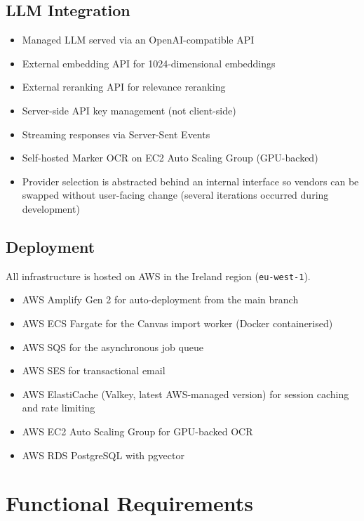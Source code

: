 \documentclass[12pt,a4paper]{article}
\begin{document}
\subsection{LLM Integration}

\begin{itemize}
    \item Managed LLM served via an OpenAI-compatible API
    \item External embedding API for 1024-dimensional embeddings
    \item External reranking API for relevance reranking
    \item Server-side API key management (not client-side)
    \item Streaming responses via Server-Sent Events
    \item Self-hosted Marker OCR on EC2 Auto Scaling Group (GPU-backed)
    \item Provider selection is abstracted behind an internal interface so vendors can be swapped without user-facing change (several iterations occurred during development)
\end{itemize}

\subsection{Deployment}

All infrastructure is hosted on AWS in the Ireland region (\texttt{eu-west-1}).

\begin{itemize}
    \item AWS Amplify Gen 2 for auto-deployment from the main branch
    \item AWS ECS Fargate for the Canvas import worker (Docker containerised)
    \item AWS SQS for the asynchronous job queue
    \item AWS SES for transactional email
    \item AWS ElastiCache (Valkey, latest AWS-managed version) for session caching and rate limiting
    \item AWS EC2 Auto Scaling Group for GPU-backed OCR
    \item AWS RDS PostgreSQL with pgvector
\end{itemize}

\section{Functional Requirements}
\end{document}
